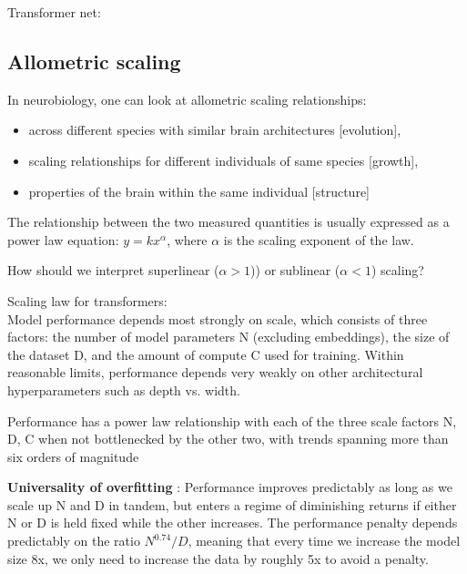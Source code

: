 \documentclass[12pt,a4paper]{article}
\begin{document}
Transformer net: \\




\subsection{Allometric scaling}
In neurobiology, one can look at allometric scaling relationships:
\begin{itemize}
    \item across different species with similar brain architectures [evolution],
    \item scaling relationships for different individuals of same species [growth],
    \item properties of the brain within the same individual [structure]
\end{itemize}

The relationship between the two measured quantities is usually expressed as a power law equation: $y=kx^\alpha$, where $\alpha$ is the scaling exponent of the law. 

How should we interpret superlinear ($\alpha >1$)) or sublinear ($\alpha<1$) scaling?

Scaling law for transformers:\\
Model performance depends most strongly on scale, which consists of three factors: the number of model parameters N (excluding embeddings), the size of the dataset D, and the amount of compute C used for training. Within reasonable limits, performance depends very weakly on other architectural hyperparameters such as depth vs. width.

Performance has a power law relationship with each of the three scale factors N, D, C when not bottlenecked by the other two, with trends spanning more than six orders of magnitude


\textbf{Universality of overfitting} : Performance improves predictably as long as we scale up N and D in
tandem, but enters a regime of diminishing returns if either N or D is held fixed while the other increases. The performance penalty depends predictably on the ratio $N^0.74/D$, meaning that every time we increase the model size 8x, we only need to increase the data by roughly 5x to avoid a penalty.
\end{document}
